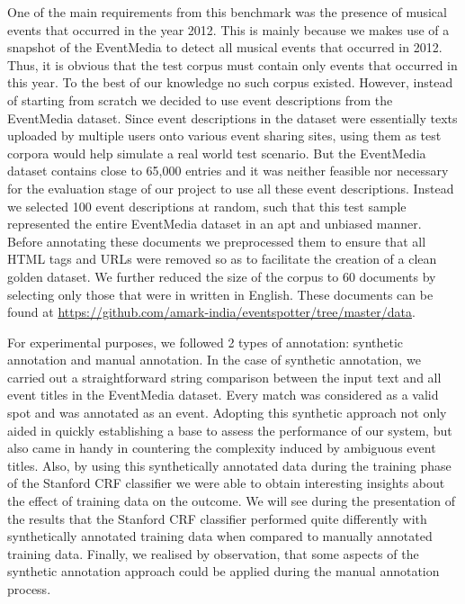 \documentclass[10pt,a4paper]{article}
\begin{document}
One of the main requirements from this benchmark was the presence of musical events that occurred in the year 2012. This is mainly because we makes use of a snapshot of the EventMedia to detect all musical events that occurred in 2012. Thus, it is obvious that the test corpus must contain only events that occurred in this year. To the best of our knowledge no such corpus existed. However, instead of starting from scratch we decided to use event descriptions from the EventMedia dataset. Since event descriptions in the dataset were essentially texts uploaded by multiple users onto various event sharing sites, using them as test corpora would help simulate a real world test scenario. But the EventMedia dataset contains close to 65,000 entries and it was neither feasible nor necessary for the evaluation stage of our project to use all these event descriptions. Instead we selected 100 event descriptions at random, such that this test sample represented the entire EventMedia dataset in an apt and unbiased manner. Before annotating these documents we preprocessed them to ensure that all HTML tags and URLs were removed so as to facilitate the creation of a clean golden dataset. We further reduced the size of the corpus to 60 documents by selecting only those that were in written in English. These documents can be found at \url{https://github.com/amark-india/eventspotter/tree/master/data}. 

For experimental purposes, we followed 2 types of annotation: synthetic annotation and manual annotation.
In the case of synthetic annotation, we carried out a straightforward string comparison between the input text and all event titles in the EventMedia dataset. Every match was considered as a valid spot and was annotated as an event. Adopting this synthetic approach not only aided in quickly establishing a base to assess the performance of our system, but also came in handy in countering the complexity induced by ambiguous event titles. Also, by using this synthetically annotated data during the training phase of the Stanford CRF classifier we were able to obtain interesting insights about the effect of training data on the outcome. We will see during the presentation of the results that the Stanford CRF classifier performed quite differently with synthetically annotated training data when compared to manually annotated training data. Finally, we realised by observation, that some aspects of the synthetic annotation approach could be applied during the manual annotation process. 
\end{document}

